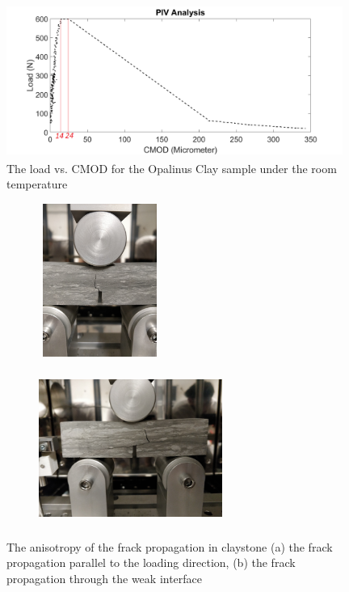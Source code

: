 \begin{figure}[!ht]
\centering
\includegraphics[width=11cm,height=5cm]{figures/Amir_Fracture_Toughness_Result_20.png}
\caption{The load vs. CMOD for the Opalinus Clay sample under the room temperature}
\label{fig:Amir_Fracture_Toughness_Result_20}
\end{figure}

\begin{figure}[!ht]
\centering
\begin{subfigure}[c]{0.43\textwidth}
\centering
\includegraphics[width=4cm,height=5cm]{figures/Amir_Fracture_Toughness_Fracture_a.png}
\subcaption{}
\label{fig:Amir_Fracture_Toughness_Fracture_a}
\end{subfigure}
\hfill
\begin{subfigure}[c]{0.55\textwidth}
\centering
\includegraphics[width=6cm,height=5cm]{figures/Amir_Fracture_Toughness_Fracture_b.png}
\subcaption{}
\label{fig:Amir_Fracture_Toughness_Fracture_b}
\end{subfigure}
\caption{The anisotropy of the frack propagation in claystone (a) the frack propagation parallel to the loading direction, (b) the frack propagation through the weak interface}
\end{figure}

